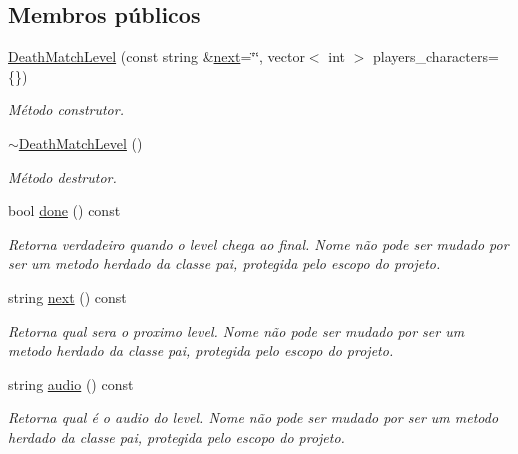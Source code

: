 \subsection*{Membros públicos}
\begin{DoxyCompactItemize}
\item 
\mbox{\hyperlink{classDeathMatchLevel_a3a0a88f354b3de9651f1a7d0dc0915ce}{Death\+Match\+Level}} (const string \&\mbox{\hyperlink{classDeathMatchLevel_a650f2b1aee68613f4b127393a7e33b08}{next}}=\char`\"{}\char`\"{}, vector$<$ int $>$ players\+\_\+characters=\{\})
\begin{DoxyCompactList}\small\item\em Método construtor. \end{DoxyCompactList}\item 
\mbox{\label{classDeathMatchLevel_a304fb1254fe6b0d7f7d6e9e062281c99}} 
\mbox{\hyperlink{classDeathMatchLevel_a304fb1254fe6b0d7f7d6e9e062281c99}{$\sim$\+Death\+Match\+Level}} ()
\begin{DoxyCompactList}\small\item\em Método destrutor. \end{DoxyCompactList}\item 
bool \mbox{\hyperlink{classDeathMatchLevel_afb51c6bc79031214f50b3cbbe401be9f}{done}} () const
\begin{DoxyCompactList}\small\item\em Retorna verdadeiro quando o level chega ao final. Nome não pode ser mudado por ser um metodo herdado da classe pai, protegida pelo escopo do projeto. \end{DoxyCompactList}\item 
string \mbox{\hyperlink{classDeathMatchLevel_a650f2b1aee68613f4b127393a7e33b08}{next}} () const
\begin{DoxyCompactList}\small\item\em Retorna qual sera o proximo level. Nome não pode ser mudado por ser um metodo herdado da classe pai, protegida pelo escopo do projeto. \end{DoxyCompactList}\item 
string \mbox{\hyperlink{classDeathMatchLevel_a7114eedff2c865c69efcad08ce97c252}{audio}} () const
\begin{DoxyCompactList}\small\item\em Retorna qual é o audio do level. Nome não pode ser mudado por ser um metodo herdado da classe pai, protegida pelo escopo do projeto. \end{DoxyCompactList}\end{DoxyCompactItemize}

